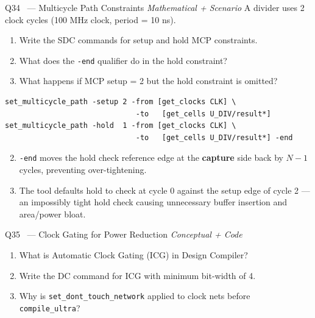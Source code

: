 \documentclass[12pt,a4paper]{article}
\newcommand{\advanced}{%
  \fbox{\textcolor{advred}{\bfseries\sffamily\small ADVANCED}}}
\begin{document}
\begin{questionbox}{Q34 \advanced\ --- Multicycle Path Constraints \hfill\textit{Mathematical + Scenario}}
A divider uses 2 clock cycles (100 MHz clock, period = 10 ns).
\begin{enumerate}[label=\textbf{\alph*)}]
  \item Write the SDC commands for setup and hold MCP constraints.
  \item What does the \texttt{-end} qualifier do in the hold constraint?
  \item What happens if MCP setup = 2 but the hold constraint is omitted?
\end{enumerate}
\end{questionbox}

\begin{answerbox}
\begin{lstlisting}[style=tclstyle]
set_multicycle_path -setup 2 -from [get_clocks CLK] \
                              -to   [get_cells U_DIV/result*]
set_multicycle_path -hold  1 -from [get_clocks CLK] \
                              -to   [get_cells U_DIV/result*] -end
\end{lstlisting}
\begin{enumerate}[label=\textbf{\alph*)}]
  \setcounter{enumi}{1}
  \item \texttt{-end} moves the hold check reference edge at the \textbf{capture} side back by $N-1$ cycles, preventing over-tightening.
  \item The tool defaults hold to check at cycle 0 against the setup edge of cycle 2 --- an impossibly tight hold check causing unnecessary buffer insertion and area/power bloat.
\end{enumerate}
\end{answerbox}

\begin{questionbox}{Q35 \advanced\ --- Clock Gating for Power Reduction \hfill\textit{Conceptual + Code}}
\begin{enumerate}[label=\textbf{\alph*)}]
  \item What is Automatic Clock Gating (ICG) in Design Compiler?
  \item Write the DC command for ICG with minimum bit-width of 4.
  \item Why is \texttt{set\_dont\_touch\_network} applied to clock nets before \texttt{compile\_ultra}?
\end{enumerate}
\end{questionbox}
\end{document}
